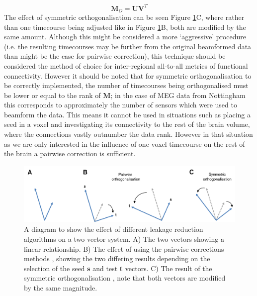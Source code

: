 \begin{equation}
\mathbf{M}_O = \mathbf{UV}^T
\end{equation} The effect of symmetric orthogonalisation can be seen Figure \ref{figure_3_2a}C, where rather than one timecourse being adjusted like in Figure \ref{figure_3_2a}B, both are modified by the same amount. Although this might be considered a more ‘aggressive’ procedure (i.e. the resulting timecourses may be further from the original beamformed data than might be the case for pairwise correction), this technique
should be considered the method of choice for inter-regional all-to-all metrics of functional
connectivity. However it should be noted that for symmetric orthogonalisation to be correctly implemented, the number of timecourses being orthogonalised must be lower or equal to the rank of \textbf{M}; in the case of MEG data from Nottingham this corresponds to approximately the number of sensors which were used to beamform the data. This means it cannot be used in situations such as placing a seed in a voxel and investigating its connectivity to the rest of the brain volume, where the connections vastly outnumber the data rank. However in that situation as we are only interested in the influence of one voxel timecourse on the rest of the brain a pairwise correction is sufficient. 

\begin{figure}[h!]
	\begin{center}
		\includegraphics[width=\linewidth]{./images/chapter3/orthogonal.pdf}\caption{A diagram to show the effect of different leakage reduction algorithms on a two vector system. A) The two vectors showing a linear relationship. B) The effect of using the pairwise corrections methods \citep{Brookes2012b}, showing the two differing results depending on the selection of the seed \textbf{s} and test \textbf{t} vectors. C) The result of the symmetric orthogonalisation \citep{Colclough2015}, note that both vectors are modified by the same magnitude.\label{figure_3_2a}}
	\end{center}
\end{figure}

